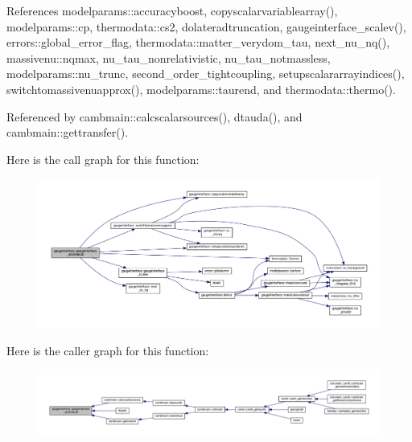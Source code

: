 References modelparams\+::accuracyboost, copyscalarvariablearray(), modelparams\+::cp, thermodata\+::cs2, dolateradtruncation, gaugeinterface\+\_\+scalev(), errors\+::global\+\_\+error\+\_\+flag, thermodata\+::matter\+\_\+verydom\+\_\+tau, next\+\_\+nu\+\_\+nq(), massivenu\+::nqmax, nu\+\_\+tau\+\_\+nonrelativistic, nu\+\_\+tau\+\_\+notmassless, modelparams\+::nu\+\_\+trunc, second\+\_\+order\+\_\+tightcoupling, setupscalararrayindices(), switchtomassivenuapprox(), modelparams\+::taurend, and thermodata\+::thermo().



Referenced by cambmain\+::calcscalarsources(), dtauda(), and cambmain\+::gettransfer().

Here is the call graph for this function\+:
\nopagebreak
\begin{figure}[H]
\begin{center}
\leavevmode
\includegraphics[width=350pt]{namespacegaugeinterface_a11f5c8bd6a22537e4a85362dc8dbf3af_cgraph}
\end{center}
\end{figure}
Here is the caller graph for this function\+:
\nopagebreak
\begin{figure}[H]
\begin{center}
\leavevmode
\includegraphics[width=350pt]{namespacegaugeinterface_a11f5c8bd6a22537e4a85362dc8dbf3af_icgraph}
\end{center}
\end{figure}
\mbox{\label{namespacegaugeinterface_a048447959e15ae6dd9e887a61e135d0c}} 
